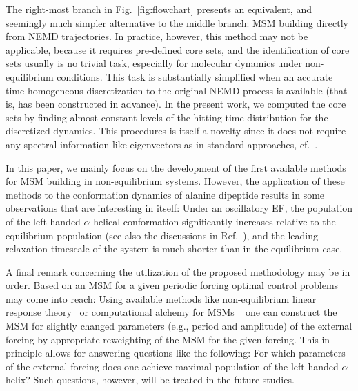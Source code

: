 \documentclass[aps, pre, preprint,unsortedaddress,a4paper,onecolumn,showkeys]{revtex4}
\begin{document}
The right-most branch in Fig.~\ref{fig:flowchart} presents an
equivalent, and seemingly
much simpler alternative to the middle branch: MSM building directly from NEMD trajectories.
In practice, however, this method may not be applicable, because
it requires pre-defined core sets, and the identification of core sets 
usually is no trivial task, especially for molecular dynamics under non-equilibrium conditions.
This task is substantially simplified when an accurate time-homogeneous discretization 
to the original NEMD process is available (that is, has been constructed in advance).
In the present work, we computed the core sets by
finding almost constant levels of the hitting time distribution for the discretized dynamics. 
This procedures is itself a novelty since it does not require any spectral information like eigenvectors as in standard approaches, cf.~\cite{prinz2011markov,A19-1}.


In this paper, we mainly focus on the development of the first available methods for MSM
building in non-equilibrium systems.
However, the application of these methods to the conformation dynamics of alanine dipeptide results in some observations that are interesting in itself: Under an
oscillatory EF, the population of the left-handed $\alpha$-helical conformation
significantly increases relative to the equilibrium population
(see also the discussions in Ref.~\cite{wang2014exploring}),
and the leading relaxation timescale of the system is much shorter than in the equilibrium case.

A final remark concerning the utilization of the proposed methodology may be in order. 
Based on an MSM for a given periodic forcing optimal control problems may come into reach:
Using available methods like non-equilibrium
linear response theory~\cite{wang2013linear} or computational alchemy for MSMs ~\cite{schutte2014markov} one can construct the MSM for slightly changed parameters (e.g., period and amplitude) of the external forcing by appropriate reweighting of the MSM for the given forcing. This in principle allows for  answering questions like the following:
For which parameters of the external forcing does one achieve maximal population of  the left-handed $\alpha$-helix?
Such questions, however, will
be treated in the future studies.


  
\end{document}
